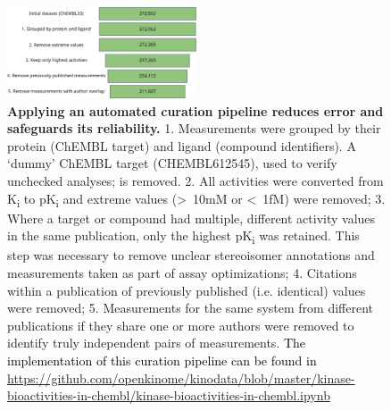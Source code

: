 \documentclass[9pt,lessons]{livecoms}
\newcommand{\revision}[1]{\textcolor{black}{#1}}
\begin{document}
\begin{figure}[tbp]
    \centering
    \includegraphics[width=0.5\textwidth]{figures/kinodata_filtering.pdf}
    \caption{
    {\bf Applying an automated curation pipeline reduces error and safeguards its reliability. } 1. Measurements were grouped by their protein (ChEMBL target) and ligand (compound identifiers). A `dummy' ChEMBL target (CHEMBL612545), used to verify unchecked analyses; is removed. 2. %
    All activities were converted from K\textsubscript{i} to pK\textsubscript{i} and extreme values (\textgreater\ 10mM or \textless\ 1fM) were removed; 3. Where a target or compound had multiple, different activity values in the same publication, only the highest pK\textsubscript{i} was retained. This step was necessary to remove unclear stereoisomer annotations and measurements taken as part of assay optimizations; 4. Citations within a publication of previously published (i.e. identical) values were removed; 5. Measurements for the same system from different publications if they share one or more authors were removed to identify truly independent pairs of measurements. \revision{The implementation of this curation pipeline can be found in \url{https://github.com/openkinome/kinodata/blob/master/kinase-bioactivities-in-chembl/kinase-bioactivities-in-chembl.ipynb}}
    }
    \label{fig:chembl_processing}
\end{figure}




\end{document}
